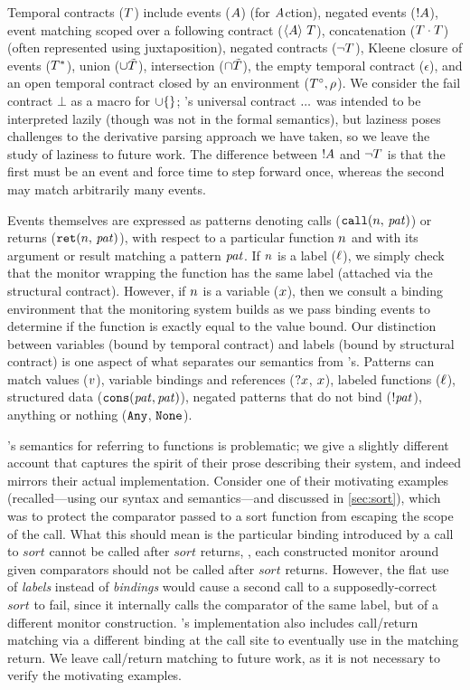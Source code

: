 Temporal contracts ($T$) include events ($A$) (for $A$ction), negated events ($! A$), event matching scoped over a following contract ($\langle A\rangle\ T$), concatenation ($T \cdot T$) (often represented using juxtaposition), negated contracts ($\neg T$), Kleene closure of events ($T^*$), union ($\cup \tilde{T}$), intersection ($\cap \tilde{T}$), the empty temporal contract ($\epsilon$), and an open temporal contract closed by an environment ($T^\circ, \rho$).
%
We consider the fail contract $\bot$ as a macro for $\cup \{\}$; \dfm's universal contract ${\tt ...}$ was intended to be interpreted lazily (though was not in the formal semantics), but laziness poses challenges to the derivative parsing approach we have taken, so we leave the study of laziness to future work.
%
The difference between $! A$ and $\neg T$ is that the first must be an event and force time to step forward once, whereas the second may match arbitrarily many events.

Events themselves are expressed as patterns denoting calls (${\tt call}(n,\, \mathit{pat})$) or returns (${\tt ret}(n,\, \mathit{pat})$), with respect to a particular function $n$ and with its argument or result matching a pattern $\mathit{pat}$.
%
If $n$ is a label ($\ell$), we simply check that the monitor wrapping the function has the same label (attached via the structural contract).
%
However, if $n$ is a variable ($x$), then we consult a binding environment that the monitoring system builds as we pass binding events to determine if the function is exactly equal to the value bound.
%
Our distinction between variables (bound by temporal contract) and labels (bound by structural contract) is one aspect of what separates our semantics from \dfm's.
%
Patterns can match values ($v$), variable bindings and references (${\tt ?} x$, $x$), labeled functions ($\ell$), structured data (${\tt cons}(\mathit{pat},\mathit{pat})$), negated patterns that do not bind ($! \mathit{pat}$), anything or nothing (${\tt Any}$, ${\tt None}$).

\dfm's semantics for referring to functions is problematic; we give a slightly different account that captures the spirit of their prose describing their system, and indeed mirrors their actual implementation.
%
Consider one of their motivating examples (recalled---using our syntax and semantics---and discussed in \autoref{sec:sort}), which was to protect the comparator passed to a sort function from escaping the scope of the call.
%
What this should mean is the particular binding introduced by a call to $sort$ cannot be called after $sort$ returns, \ie, each constructed monitor around given comparators should not be called after $sort$ returns.
%
However, the flat use of \emph{labels} instead of \emph{bindings} would cause a second call to a supposedly-correct $sort$ to fail, since it internally calls the comparator of the same label, but of a different monitor construction.
%
\dfm's implementation also includes call/return matching via a different binding at the call site to eventually use in the matching return.
%
We leave call/return matching to future work, as it is not necessary to verify the motivating examples.

